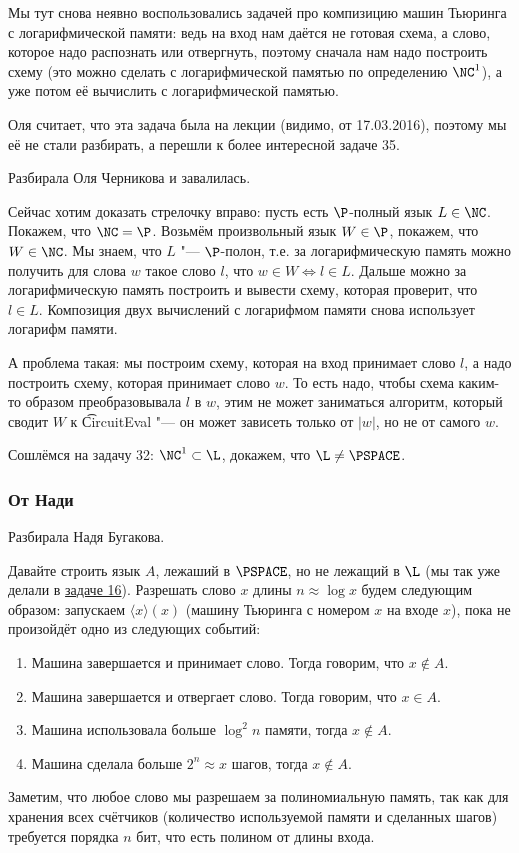 	\begin{Rem}
		Мы тут снова неявно воспользовались задачей про компизицию машин Тьюринга
		с логарифмической памяти: ведь на вход нам даётся не готовая схема,
		а слово, которое надо распознать или отвергнуть, поэтому сначала нам надо
		построить схему (это можно сделать с логарифмической памятью по определению
		$\NC^1$), а уже потом её вычислить с логарифмической памятью.
	\end{Rem}

	Оля считает, что эта задача была на лекции (видимо, от 17.03.2016),
	поэтому мы её не стали разбирать, а перешли к более интересной задаче 35.

	\TODO

	Разбирала Оля Черникова и завалилась.

	Сейчас хотим доказать стрелочку вправо: пусть есть $\P$-полный язык $L \in \NC$.
	Покажем, что $\NC=\P$.
	Возьмём произвольный язык $W \in \P$, покажем, что $W \in \NC$.
	Мы знаем, что $L$ "--- $\P$-полон, т.е. за логарифмическую память можно
	получить для слова $w$ такое слово $l$, что $w \in W \iff l \in L$.
	Дальше можно за логарифмическую память построить и вывести схему, которая проверит, что
	$l \in L$.
	Композиция двух вычислений с логарифмом памяти снова использует логарифм памяти.

	А проблема такая: мы построим схему, которая на вход принимает слово $l$, а надо
	построить схему, которая принимает слово $w$.
	То есть надо, чтобы схема каким-то образом преобразовывала $l$ в $w$, этим не может заниматься
	алгоритм, который сводит $W$ к \t{CircuitEval} "--- он может зависеть только от $|w|$, но не
	от самого $w$.

	Сошлёмся на задачу 32: $\NC^1 \subset \L$, докажем, что $\L \neq \PSPACE$.
	\subsubsection{От Нади}
		Разбирала Надя Бугакова.

		Давайте строить язык $A$, лежаший в $\PSPACE$, но не лежащий в $\L$ (мы так уже делали в \hyperref[prob16]{задаче 16}).
		Разрешать слово $x$ длины $n \approx \log x$ будем следующим образом: запускаем $\langle x \rangle(x)$
		(машину Тьюринга с номером $x$ на входе $x$), пока не произойдёт одно из следующих событий:
		\begin{enumerate}
			\item Машина завершается и принимает слово. Тогда говорим, что $x \notin A$.
			\item Машина завершается и отвергает слово. Тогда говорим, что $x \in A$.
			\item Машина использовала больше $\log^2 n$ памяти, тогда $x \notin A$.
			\item Машина сделала больше $2^n \approx x$ шагов, тогда $x \notin A$.
		\end{enumerate}
		Заметим, что любое слово мы разрешаем за полиномиальную память, так как для хранения
		всех счётчиков (количество используемой памяти и сделанных шагов) требуется порядка
		$n$ бит, что есть полином от длины входа.
		
